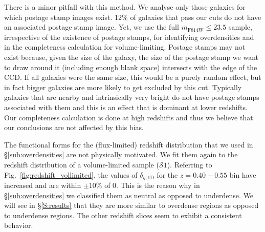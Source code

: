 \documentclass[twocolumn,useAMS,usenatbib]{mn2e}
\newcommand{\rachel}[1]{}
\newcommand{\arun}[1]{}
\newcommand{\s}{\ensuremath{\mathcal{S}}}
\begin{document}
There is a minor pitfall with this method. We analyse only those galaxies for which postage stamp images exist.
12\% of galaxies that pass our cuts do not have an associated postage stamp image.
Yet, we use the full $m_\text{F814W}\le23.5$ sample, irrespective of the existence of postage stamps, for identifying overdensities and in the completeness calculation for volume-limiting.
Postage stamps may not exist because, given the size of the galaxy, the size of the postage stamp we want to draw around it (including enough blank space) intersects with the edge of the CCD.
If all galaxies were the same size, this would be a purely random effect, but in fact bigger galaxies are more likely to get excluded by this cut. 
Typically galaxies that are nearby and intrinsically very bright do not have postage stamps associated with them and this is an effect that is dominant at lower redshifts. 
Our completeness calculation is done at high redshifts and thus we believe that our conclusions are not affected by this bias. 


The functional forms for the (flux-limited) redshift distribution that we used in \S\ref{sub:overdensities} are not physically motivated. We fit them again to the  
redshift distribution of a volume-limited sample (\s$1$). Referring to Fig.~\ref{fig:redshift_vollimited}, the values of $\delta_{g,\text{1D}}$ for the $z=0.40-0.55$ bin have increased and are within $\pm 10\%$ of 0. This is the reason why in \S\ref{sub:overdensities} we classified them as neutral as opposed to underdense.
We will see in \S\ref{S:results} that they are more similar to overdense regions as opposed to underdense regions.
The other redshift slices seem to exhibit a consistent behavior. 
\end{document}
